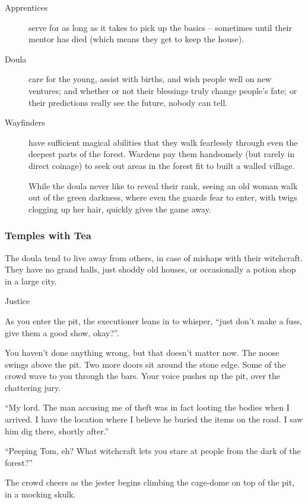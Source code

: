 \begin{multicols}{2}
  \begin{description}
    \item[Apprentices]
    serve for as long as it takes to pick up the basics -- sometimes until their mentor has died (which means they get to keep the house).
    \item[Doula]
    care for the young, assist with births, and wish people well on new ventures; and whether or not their blessings truly change people's fate; or their predictions really see the future, nobody can tell.
    \item[Wayfinders]
    have sufficient magical abilities that they walk fearlessly through even the deepest parts of the forest.
    Wardens pay them handsomely (but rarely in direct coinage) to seek out areas in the forest fit to built a walled village.

    While the doula never like to reveal their rank, seeing an old woman walk out of the green darkness, where even the \glspl{guard} fear to enter, with twigs clogging up her hair, quickly gives the game away.
  \end{description}

\subsubsection{Temples with Tea}
The doula tend to live away from others, in case of mishaps with their witchcraft.
They have no grand halls, just shoddy old houses, or occasionally a potion shop in a large city.

  {Justice}%
  {
    As you enter the pit, the executioner leans in to whisper, ``just don't make a fuss, give them a good show, okay?''.

    You haven't done anything wrong, but that doesn't matter now.
    The noose swings above the pit.
    Two more doors sit around the stone edge.
    Some of the crowd wave to you through the bars.
    Your voice pushes up the pit, over the chattering jury.

    ``My lord.
    The man accusing me of theft was in fact looting the bodies when I arrived.
    I have the location where I believe he buried the items on the road.
    I saw him dig there, shortly after.''

    {\sffamily ``Peeping Tom, eh?
    What witchcraft lets you stare at people from the dark of the forest?''}

    The crowd cheers as the jester begins climbing the cage-dome on top of the pit, in a mocking skulk.

}
\end{multicols}
